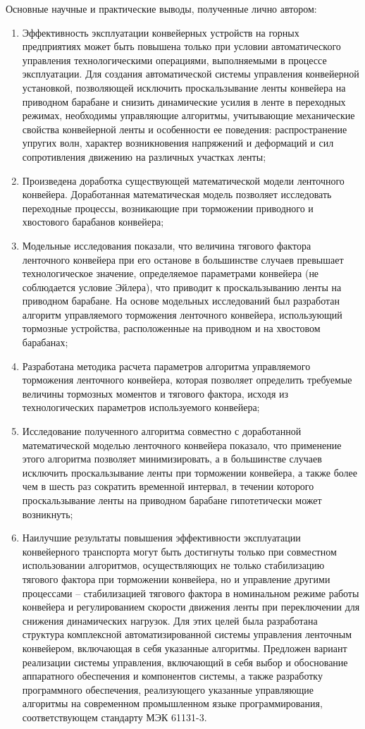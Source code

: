 Основные научные и практические выводы, полученные лично автором:
\begin{enumerate}
  \item Эффективность эксплуатации конвейерных устройств на горных предприятиях может быть повышена только при условии автоматического управления технологическими операциями, выполняемыми в процессе эксплуатации. Для создания автоматической системы управления конвейерной установкой, позволяющей исключить проскальзывание ленты конвейера на приводном барабане и снизить динамические усилия в ленте в переходных режимах, необходимы управляющие алгоритмы, учитывающие механические свойства  конвейерной ленты и особенности ее поведения: распространение упругих волн, характер возникновения напряжений и деформаций и сил сопротивления движению на различных участках ленты;
  \item Произведена доработка существующей математической модели ленточного конвейера. Доработанная математическая модель позволяет исследовать переходные процессы, возникающие при торможении приводного и хвостового барабанов конвейера;
  \item Модельные исследования показали, что величина тягового фактора ленточного конвейера при его останове в большинстве случаев превышает технологическое значение, определяемое параметрами конвейера (не соблюдается условие Эйлера), что приводит к проскальзыванию ленты на приводном барабане. На основе модельных исследований был разработан алгоритм управляемого торможения ленточного конвейера, использующий тормозные устройства, расположенные на приводном и на хвостовом барабанах;
  \item Разработана методика расчета параметров алгоритма управляемого торможения ленточного конвейера, которая позволяет определить требуемые величины тормозных моментов и тягового фактора, исходя из технологических параметров используемого конвейера;
  \item Исследование полученного алгоритма совместно с доработанной математической моделью ленточного конвейера показало, что применение этого алгоритма позволяет минимизировать, а в большинстве случаев исключить проскальзывание ленты при торможении конвейера, а также более чем в шесть раз сократить временной интервал, в течении которого проскальзывание ленты на приводном барабане гипотетически может возникнуть;
  \item Наилучшие результаты повышения эффективности эксплуатации конвейерного транспорта могут быть достигнуты только при совместном использовании алгоритмов, осуществляющих не только стабилизацию тягового фактора при торможении конвейера, но и управление другими процессами -- стабилизацией тягового фактора в номинальном режиме работы конвейера и регулированием скорости движения ленты при переключении для снижения динамических нагрузок. Для этих целей была разработана структура комплексной автоматизированной системы управления ленточным конвейером, включающая в себя указанные алгоритмы. Предложен вариант реализации системы управления, включающий в себя выбор и обоснование аппаратного обеспечения и компонентов системы, а также разработку программного обеспечения, реализующего указанные управляющие алгоритмы на современном промышленном языке программирования, соответствующем стандарту МЭК 61131-3.
\end{enumerate}

\clearpage